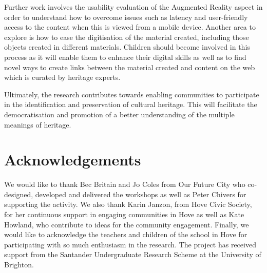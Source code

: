 \documentclass[acmlarge,screen,dvipsnames]{acmart}
\begin{document}
Further work involves the usability evaluation of the Augmented Reality aspect
in order to understand how to overcome issues such as latency and
user-friendly access to the content when this is viewed from a mobile device.
Another area to explore is how to ease the digitisation of the material
created, including those objects created in different materials. Children should
become involved in this process as it will enable them to enhance their digital
skills as well as to find novel ways to create links between the material created and
content on the web which is curated by heritage experts. 



Ultimately, the research contributes towards enabling communities to
participate in the identification and preservation of cultural heritage. This will 
 facilitate the democratisation and promotion of a better understanding
of the multiple meanings of heritage.


\section{Acknowledgements} We would like to thank Bec Britain and Jo Coles
from Our Future City who co-designed, developed and delivered the workshops as
well as Peter Chivers for supporting the activity. We also thank Karin Janzon,
from Hove Civic Society, for her continuous support in engaging communities in
Hove as well as Kate Howland, who contribute to ideas for the community engagement. 
Finally, we would like to acknowledge the teachers and children of the
school in Hove for participating with so much enthusiasm in the research. 
The project has received support from the Santander Undergraduate Research Scheme
at the University of Brighton.




%

 

\end{document}
